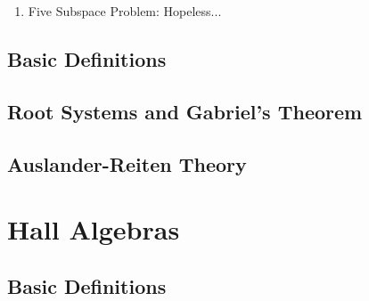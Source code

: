 \documentclass{book}
\newtheorem{example}{Example}[section]
\begin{document}
\begin{enumerate}
				\begin{example}
					Let $\dim V=2$, and consider \[V=\mathbb{C}^2, U_1 = \mathbb{C} \begin{bmatrix}1\\0\end{bmatrix},U_2 = \mathbb{C} \begin{bmatrix}0\\1\end{bmatrix},U_3 = \mathbb{C} \begin{bmatrix}1\\1\end{bmatrix},U_4 = \mathbb{C} \begin{bmatrix}1\\ \lambda\end{bmatrix}\] where $\lambda\neq 0,1$. We need to know this continuous parameter $\lambda$ to distinguish such configurations. 
				\end{example}
			More generally: the endomorphism problem embeds into the four subspace problem. For $f:U\to U$, we consider \[V=U\oplus U, \ U_1=U\oplus 0, \ U_2=0\oplus U, \ U_3=\{(x,x):x\in U\},\ U_4=\{(x,f(x)):x\in U\}.\] A base change in $V$ fixing $U_1,U_2,U_3$ amounts to conjugation of $f$. 
			\item Five Subspace Problem: Hopeless...
		\end{enumerate}
		

  \section{Basic Definitions}

  \section{Root Systems and Gabriel's Theorem}

  \section{Auslander-Reiten Theory}


\chapter{Hall Algebras}

  \section{Basic Definitions}
\end{document}
